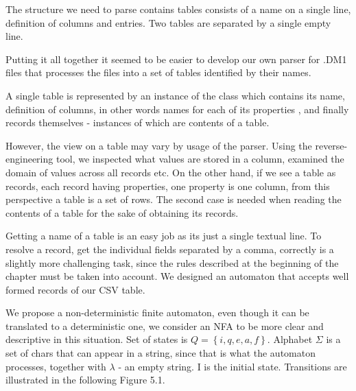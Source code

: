 The structure we need to parse contains tables consists of a name on a single line, definition of columns and entries. Two tables are separated by a single empty line.

Putting it all together it seemed to be easier to develop our own parser for .DM1 files that processes the files into a set of tables identified by their names.

A single table is represented by an instance of the class  which contains its name, definition of columns, in other words names for each of its properties , and finally records themselves - instances of  which are contents of a table.

However, the view on a table may vary by usage of the parser. Using the reverse-engineering tool, we inspected what values are stored in a column, examined the domain of values across all records etc. 
On the other hand, if we see a table as records, each record having properties, one property is one column, from this perspective a table is a set of rows.
The second case is needed when reading the contents of a table for the sake of obtaining its records.

Getting a name of a table is an easy job as its just a single textual line. To resolve a record, get the individual fields separated by a comma, correctly is a slightly more challenging task, since the rules described at the beginning of the chapter must be taken into account. 
We designed an automaton that accepts well formed records of our CSV table.

We propose a non-deterministic finite automaton, even though it can be translated to a deterministic one, we consider an NFA to be more clear and descriptive in this situation.
Set of states is $Q = \left\{i, q, e, a, f\right\}$.
Alphabet $\Sigma$ is a set of chars that can appear in a string, since that is what the automaton processes, together with $\lambda$ - an empty string.
I is the initial state.
Transitions are illustrated in the following Figure 5.1.

